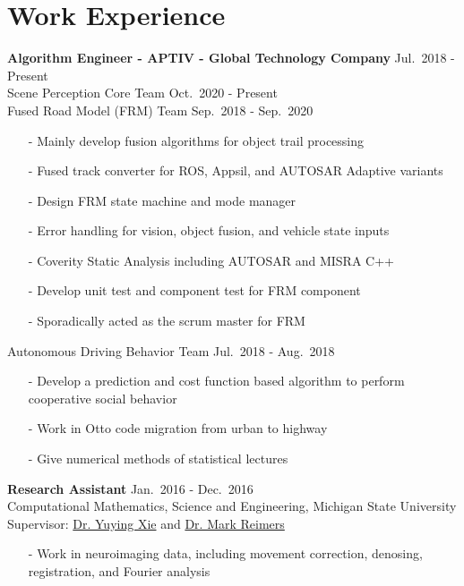\documentclass[a4paper,10pt,dvipdfmx]{article}
\begin{document}
\section*{Work Experience}
\indent \textbf{Algorithm Engineer - APTIV - Global Technology Company} \hfill Jul.~2018 - Present\\
\indent Scene Perception Core Team \hfill Oct.~2020 - Present\\
\indent Fused Road Model (FRM) Team \hfill Sep.~2018 - Sep.~2020
\begin{itemize}[noitemsep,nolistsep,leftmargin=12mm]
  \item[-] Mainly develop fusion algorithms for object trail processing
  \item[-] Fused track converter for ROS, Appsil, and AUTOSAR Adaptive variants
  \item[-] Design FRM state machine and mode manager
  \item[-] Error handling for vision, object fusion, and vehicle state inputs
  \item[-] Coverity Static Analysis including AUTOSAR and MISRA C++
  \item[-] Develop unit test and component test for FRM component
  \item[-] Sporadically acted as the scrum master for FRM
\end{itemize}

\indent Autonomous Driving Behavior Team \hfill Jul.~2018 - Aug.~2018
\begin{itemize}[noitemsep,nolistsep,leftmargin=12mm]
  \item[-] Develop a prediction and cost function based algorithm to perform cooperative social behavior
  \item[-] Work in Otto code migration from urban to highway
  \item[-] Give numerical methods of statistical lectures\\
\end{itemize}

\indent \textbf{Research Assistant} \hfill Jan.~2016 - Dec.~2016\\
\indent Computational Mathematics, Science and Engineering, Michigan State University\\
\indent Supervisor: \href{https://cmse.msu.edu/directory/faculty/yuying-xie/}{Dr. Yuying Xie} and \href{https://msu.edu/~reimersm/}{Dr. Mark Reimers}
\begin{itemize}[noitemsep,nolistsep,leftmargin=12mm]
  \item[-] Work in neuroimaging data, including movement correction, denosing, registration, and Fourier analysis\\
\end{itemize}
\end{document}
